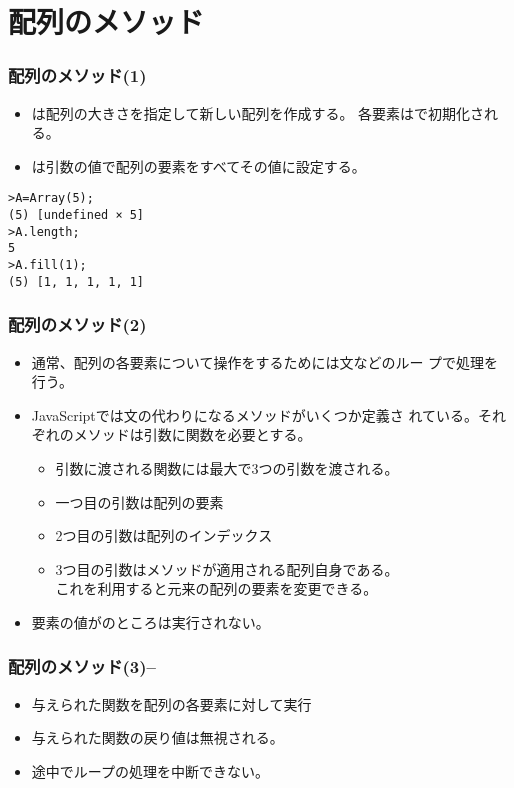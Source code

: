 

\frame{\maketitle}
\section{配列のメソッド}
\begin{frame}[containsverbatim]
 \frametitle{配列のメソッド(1)}
 \begin{itemize}
	\item {}は配列の大きさを指定して新しい配列を作成する。
				各要素はで初期化される。
	\item {}は引数の値で配列の要素をすべてその値に設定する。
 \end{itemize}
\begin{Verbatim}
>A=Array(5);
(5) [undefined × 5]
>A.length;
5
>A.fill(1);
(5) [1, 1, 1, 1, 1]
\end{Verbatim}
\end{frame}
\begin{frame}[containsverbatim]
 \frametitle{配列のメソッド(2)}
\begin{itemize}
 \item 通常、配列の各要素について操作をするためには文などのルー
 プで処理を行う。
 \item JavaScriptでは文の代わりになるメソッドがいくつか定義さ
       れている。それぞれのメソッドは引数に関数を必要とする。
       \begin{itemize}
        \item 引数に渡される関数には最大で3つの引数を渡される。
        \item 一つ目の引数は配列の要素
        \item 2つ目の引数は配列のインデックス
        \item 3つ目の引数はメソッドが適用される配列自身である。\\
              これを利用すると元来の配列の要素を変更できる。
       \end{itemize}
 \item 要素の値がのところは実行されない。
\end{itemize}
\end{frame}
\begin{frame}[containsverbatim]
 \frametitle{配列のメソッド(3)--}
 \begin{itemize}
  \item 与えられた関数を配列の各要素に対して実行
  \item 与えられた関数の戻り値は無視される。
  \item 途中でループの処理を中断できない。
  \end{itemize}
\end{frame}
